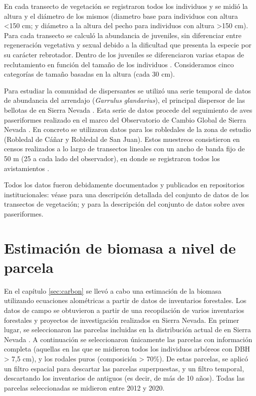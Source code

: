 En cada transecto de vegetación se registraron todos los individuos y se midió la altura y el diámetro de los mismos (diametro base para individuos con altura \textless 150 cm; y diámetro a la altura del pecho para individuos con altura \textgreater 150 cm). Para cada transecto se calculó la abundancia de juveniles, sin diferenciar entre regeneración vegetativa y sexual debido a la dificultad que presenta la especie por su carácter rebrotador. Dentro de los juveniles se diferenciaron varias etapas de reclutamiento en función del tamaño de los individuos \autocite[\emph{e.g.}][]{Plieningeretal2010LargeScalePatterns}. Consideramos cinco categorías de tamaño basadas en la altura (cada 30 cm). 

Para estudiar la comunidad de dispersantes se utilizó una serie temporal de datos de abundancia del arrendajo (\emph{Garrulus glandarius}), el principal dispersor de las bellotas de \Qpy en Sierra Nevada \autocite[][]{Gomez2003ImpactVertebrate}. Esta serie de datos procede del seguimiento de aves paseriformes realizado en el marco del Observatorio de Cambio Global de Sierra Nevada \autocites{Zamoraetal2017MonitoringGlobal,BareaAzconetal2012PasseriformesOtras}. En concreto se utilizaron datos para los robledales de la zona de estudio (Robledal de Cáñar y Robledal de San Juan). Estos muestreos consistieron en censos realizados a lo largo de transectos lineales con un ancho de banda fijo de 50 m (25 a cada lado del observador), en donde se registraron todos los avistamientos \autocites{BareaAzconetal2012PasseriformesOtras, ZamoraBareaAzcon2015LongTermChanges}. 

Todos los datos fueron debidamente documentados y publicados en repositorios institucionales: véase \citet{PerezLuqueetal2015DatasetMIGRAME} para una descripción detallada del conjunto de datos de los transectos de vegetación; y \citet{PerezLuqueetal2016DatasetPasserine} para la descripción del conjunto de datos sobre aves paseriformes. 

\section{Estimación de biomasa a nivel de parcela}\label{sec:metodologia:biomasa}

En el capítulo \ref{sec:carbon} se llevó a cabo una estimación de la biomasa utilizando ecuaciones alométricas \autocite[ver][]{Monteroetal2005ProduccionBiomasa} a partir de datos de inventarios forestales. Los datos de campo se obtuvieron a partir de una recopilación de varios inventarios forestales y proyectos de investigación realizados en Sierra Nevada. En primer lugar, se seleccionaron las parcelas incluidas en la distribución actual de \Qp en Sierra Nevada \autocite{PerezLuqueetal2019MapEcosystems}. A continuación se seleccionaron únicamente las parcelas con información completa (aquellas en las que se midieron todos los individuos arbóreos con DBH \textgreater{} 7,5 cm), y los rodales puros (composición \textgreater{} 70\%). De estas parcelas, se aplicó un filtro espacial para descartar las parcelas superpuestas, y un filtro temporal, descartando los inventarios de antiguos (es decir, de más de 10 años). Todas las parcelas seleccionadas se midieron entre 2012 y 2020. 

